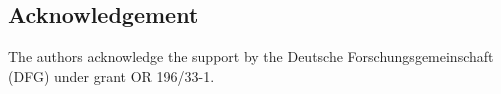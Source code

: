 \documentclass[fleqn,a4paper,10pt]{article}
\begin{document}
\begin{multicols}{2}

\section{Acknowledgement}

The authors acknowledge the support by the Deutsche Forschungsgemeinschaft (DFG) under grant OR 196/33-1.






\end{multicols}
\end{document}
